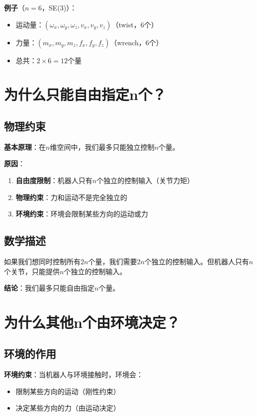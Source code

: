 \documentclass[12pt,a4paper]{article}
\begin{document}
\textbf{例子}（$n = 6$，SE(3)）：
\begin{itemize}
\item 运动量：$(\omega_x, \omega_y, \omega_z, v_x, v_y, v_z)$（twist，6个）
\item 力量：$(m_x, m_y, m_z, f_x, f_y, f_z)$（wrench，6个）
\item 总共：$2 \times 6 = 12$个量
\end{itemize}

\section{为什么只能自由指定n个？}

\subsection{物理约束}

\textbf{基本原理}：在$n$维空间中，我们最多只能独立控制$n$个量。

\textbf{原因}：
\begin{enumerate}
\item \textbf{自由度限制}：机器人只有$n$个独立的控制输入（关节力矩）
\item \textbf{物理约束}：力和运动不是完全独立的
\item \textbf{环境约束}：环境会限制某些方向的运动或力
\end{enumerate}

\subsection{数学描述}

如果我们想同时控制所有$2n$个量，我们需要$2n$个独立的控制输入。但机器人只有$n$个关节，只能提供$n$个独立的控制输入。

\textbf{结论}：我们最多只能自由指定$n$个量。

\section{为什么其他n个由环境决定？}

\subsection{环境的作用}

\textbf{环境约束}：当机器人与环境接触时，环境会：
\begin{itemize}
\item 限制某些方向的运动（刚性约束）
\item 决定某些方向的力（由运动决定）
\end{itemize}
\end{document}
